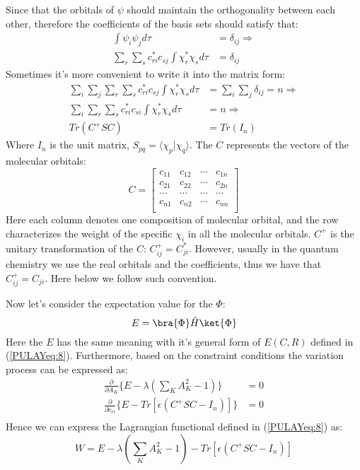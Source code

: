 Since that the orbitals of $\psi$ should maintain the orthogonality
between each other, therefore the coefficients of the basis sets
should satisfy that:
\begin{align}\label{}
  \int\psi_{i}\psi_{j}d\tau &= \delta_{ij} \Rightarrow \nonumber \\
  \sum_{r}\sum_{s}c^{*}_{ri}c_{sj}\int\chi^{*}_{r}\chi_{s}d\tau &=
  \delta_{ij}
\end{align}
Sometimes it's more convenient to write it into the matrix form:
\begin{align}\label{PULAYeq:19}
  \sum_{i}\sum_{j}\sum_{r}\sum_{s}c^{*}_{ri}c_{sj}\int\chi^{*}_{r}\chi_{s}d\tau
  &= \sum_{i}\sum_{j}\delta_{ij} = n \Rightarrow \nonumber \\
  \sum_{i}\sum_{r}\sum_{s}c^{*}_{ri}c_{si}\int\chi^{*}_{r}\chi_{s}d\tau
  &= n \Rightarrow \nonumber \\
  Tr(C^{+}SC) &= Tr(I_{n})
\end{align}
Where $I_{n}$ is the unit matrix, $S_{pq} =
\langle\chi_{p}|\chi_{q}\rangle$. The $C$ represents the vectors of
the molecular orbitals:
\begin{equation}\label{}
  C = \begin{bmatrix}
    c_{11} & c_{12} & \cdots & c_{1n} \\
    c_{21} & c_{22} & \cdots & c_{2n} \\
    \cdots &\cdots  & \cdots & \cdots \\
    c_{n1} & c_{n2} & \cdots & c_{nn} \\
  \end{bmatrix}
\end{equation}
Here each column denotes one composition of molecular orbital, and the
row characterizes the weight of the specific $\chi_{i}$ in all the
molecular orbitals. $C^{+}$ is the unitary transformation of the $C$:
$C^{+}_{ij} = C_{ji}^{*}$. However, usually in the quantum chemistry
we use the real orbitals and the coefficients, thus we have that
$C^{+}_{ij} = C_{ji}$. Here below we follow such convention.

Now let's consider the expectation value for the $\Phi$:
\begin{equation}\label{PULAYeq:24}
  E = \bra{\Phi}\hat{H}\ket{\Phi}
\end{equation}
Here the $E$ has the same meaning with it's general form of $E(C,R)$
defined in (\ref{PULAYeq:8}). Furthermore, based on the constraint
conditions the variation process can be expressed as:
\begin{equation}\label{PULAYeq:10}
  \begin{split}
    \frac{\partial}{\partial A_{K}} \Big\{
    E -  \lambda(\sum_{K}A_{K}^{2} - 1)\Big\}&=  0  \\
    \frac{\partial}{\partial c_{ri}} \Big\{ E - Tr[\epsilon(C^{+}SC-
    I_{n})]\Big\}&=  0  \\
  \end{split}
\end{equation}
Hence we can express the Lagrangian functional defined in
(\ref{PULAYeq:8}) as:
\begin{equation}\label{PULAYeq:9}
  W = E - \lambda(\sum_{K}A_{K}^{2} - 1) - Tr[\epsilon(C^{+}SC -
  I_{n})]
\end{equation}


